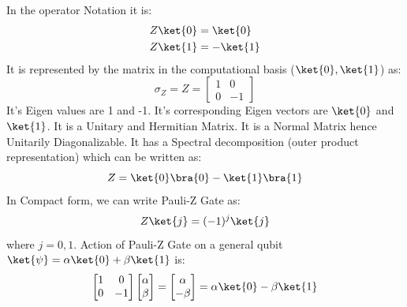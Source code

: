 \documentclass[12pt, oneside]{book}
\theoremstyle{definition}
\theoremstyle{definition}
\theoremstyle{remark}
\begin{document}
In the operator Notation it is:
\begin{align*}
    Z\ket{0}&=\ket{0} \\
    Z\ket{1}&=-\ket{1}
\end{align*}
It is represented by the matrix in the computational basis ($\ket{0},\ket{1}$) as:
\[
    \sigma_Z=Z=\begin{bmatrix}
        1 & 0 \\
        0 & -1
    \end{bmatrix}
\]
It's Eigen values are 1 and -1. It's corresponding Eigen vectors are $\ket{0}$ and $\ket{1}$.
It is a Unitary and Hermitian Matrix. It is a Normal Matrix hence Unitarily Diagonalizable.
It has a Spectral decomposition (outer product representation) which can be written as:
\[
    Z=\ket{0}\bra{0}-\ket{1}\bra{1}
\]
In Compact form, we can write Pauli-Z Gate as:
\[
    Z\ket{j}=(-1)^j\ket{j}
\]
where $j=0,1$.
Action of Pauli-Z Gate on a general qubit $\ket{\psi}=\alpha\ket{0}+\beta\ket{1}$ is:
\[
    \begin{bmatrix}
        1 & 0 \\
        0 & -1
    \end{bmatrix}\begin{bmatrix}
        \alpha \\
        \beta
    \end{bmatrix}=\begin{bmatrix}
        \alpha \\
        -\beta
    \end{bmatrix}=\alpha\ket{0}-\beta\ket{1}
\]
\end{document}
